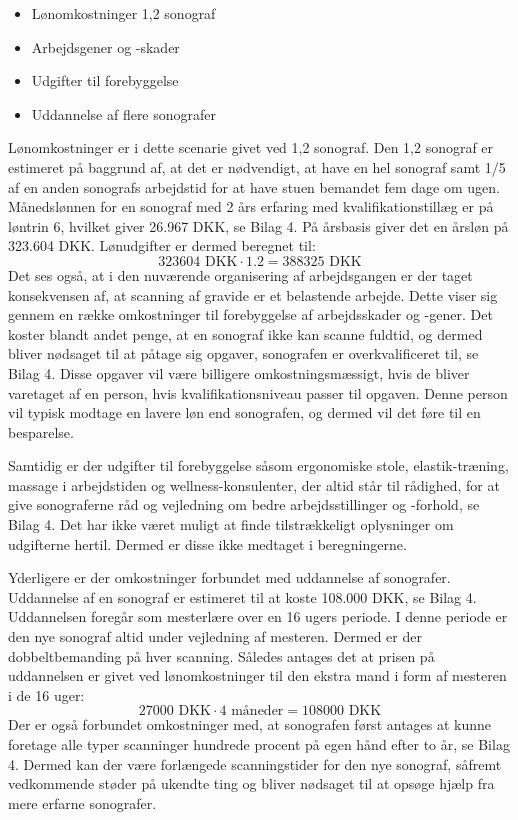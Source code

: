 \begin{itemize}
\item Lønomkostninger 1,2 sonograf
\item Arbejdsgener og -skader
\item Udgifter til forebyggelse
\item Uddannelse af flere sonografer
\end{itemize}
Lønomkostninger er i dette scenarie givet ved 1,2 sonograf. Den 1,2 sonograf er estimeret på baggrund af, at det er nødvendigt, at have en hel sonograf samt 1/5 af en anden sonografs arbejdstid for at have stuen bemandet fem dage om ugen. Månedslønnen for en sonograf med 2 års erfaring med kvalifikationstillæg er på løntrin 6, hvilket giver 26.967 DKK, se Bilag 4. På årsbasis giver det en årsløn på 323.604 DKK. Lønudgifter er dermed beregnet til:
\begin{equation}
323604 \text{ DKK}\cdot1.2 = 388325 \text{ DKK}
\end{equation}
Det ses også, at i den nuværende organisering af arbejdsgangen er der taget konsekvensen af, at scanning af gravide er et belastende arbejde. Dette viser sig gennem en række omkostninger til forebyggelse af arbejdsskader og -gener. Det koster blandt andet penge, at en sonograf ikke kan scanne fuldtid, og dermed bliver nødsaget til at påtage sig opgaver, sonografen er overkvalificeret til, se Bilag 4. Disse opgaver vil være billigere omkostningsmæssigt, hvis de bliver varetaget af en person, hvis kvalifikationsniveau passer til opgaven. Denne person vil typisk modtage en lavere løn end sonografen, og dermed vil det føre til en besparelse.

Samtidig er der udgifter til forebyggelse såsom ergonomiske stole, elastik-træning, massage i arbejdstiden og wellness-konsulenter, der altid står til rådighed, for at give sonograferne råd og vejledning om bedre arbejdsstillinger og -forhold, se Bilag 4. Det har ikke været muligt at finde tilstrækkeligt oplysninger om udgifterne hertil. Dermed er disse ikke medtaget i beregningerne. 

Yderligere er der omkostninger forbundet med uddannelse af sonografer. Uddannelse af en sonograf er estimeret til at koste 108.000 DKK, se Bilag 4. Uddannelsen foregår som mesterlære over en 16 ugers periode. I denne periode er den nye sonograf altid under vejledning af mesteren. Dermed er der dobbeltbemanding på hver scanning. Således antages det at prisen på uddannelsen er givet ved lønomkostninger til den ekstra mand i form af mesteren i de 16 uger:
\begin{equation}
27000 \text{ DKK}\cdot4 \text{ måneder} = 108000 \text{ DKK}
\end{equation}
Der er også forbundet omkostninger med, at sonografen først antages at kunne foretage alle typer scanninger hundrede procent på egen hånd efter to år, se Bilag 4. Dermed kan der være forlængede scanningstider for den nye sonograf, såfremt vedkommende støder på ukendte ting og bliver nødsaget til at opsøge hjælp fra mere erfarne sonografer.

